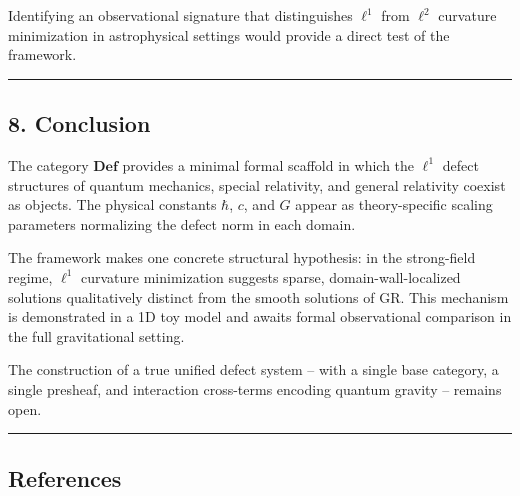 \documentclass[
]{article}
\begin{document}
Identifying an observational signature that distinguishes \(\ell^1\)
from \(\ell^2\) curvature minimization in astrophysical settings would
provide a direct test of the framework.

\begin{center}\rule{0.5\linewidth}{0.5pt}\end{center}

\subsection{8. Conclusion}\label{conclusion}

The category \(\mathbf{Def}\) provides a minimal formal scaffold in
which the \(\ell^1\) defect structures of quantum mechanics, special
relativity, and general relativity coexist as objects. The physical
constants \(\hbar\), \(c\), and \(G\) appear as theory-specific scaling
parameters normalizing the defect norm in each domain.

The framework makes one concrete structural hypothesis: in the
strong-field regime, \(\ell^1\) curvature minimization suggests sparse,
domain-wall-localized solutions qualitatively distinct from the smooth
solutions of GR. This mechanism is demonstrated in a 1D toy model and
awaits formal observational comparison in the full gravitational
setting.

The construction of a true unified defect system -- with a single base
category, a single presheaf, and interaction cross-terms encoding
quantum gravity -- remains open.

\begin{center}\rule{0.5\linewidth}{0.5pt}\end{center}

\subsection{References}\label{references}
\end{document}
